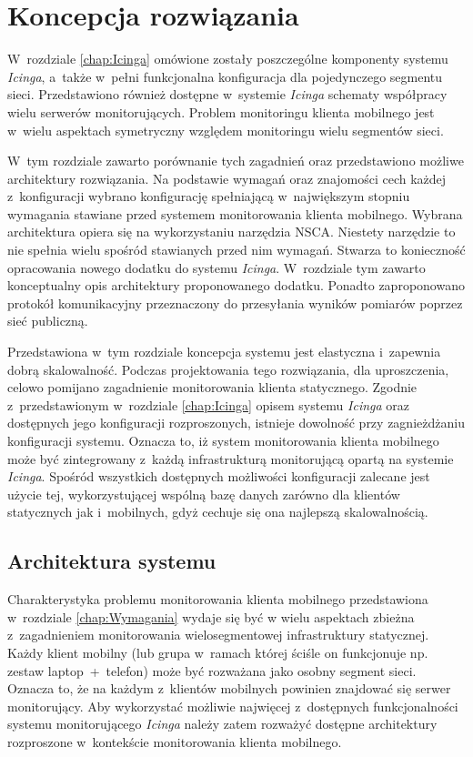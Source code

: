 \chapter{Koncepcja rozwiązania}
\label{chap:ProjektSystemu}

W~rozdziale \ref{chap:Icinga} omówione zostały poszczególne komponenty
systemu {\em Icinga}, a~także w~pełni funkcjonalna konfiguracja dla
pojedynczego segmentu sieci. Przedstawiono również dostępne w~systemie
{\em Icinga} schematy współpracy wielu serwerów monitorujących. Problem
monitoringu klienta mobilnego jest w~wielu aspektach symetryczny
względem monitoringu wielu segmentów sieci.

W~tym rozdziale zawarto porównanie tych zagadnień oraz przedstawiono
możliwe architektury rozwiązania. Na podstawie wymagań oraz znajomości
cech każdej z~konfiguracji wybrano konfigurację spełniającą
w~największym stopniu wymagania stawiane przed systemem monitorowania
klienta mobilnego. Wybrana architektura opiera się na wykorzystaniu
narzędzia NSCA. Niestety narzędzie to nie spełnia wielu spośród
stawianych przed nim wymagań. Stwarza to konieczność opracowania
nowego dodatku do systemu {\em Icinga}. W~rozdziale tym zawarto konceptualny
opis architektury proponowanego dodatku. Ponadto zaproponowano
protokół komunikacyjny przeznaczony do przesyłania wyników pomiarów
poprzez sieć publiczną.

Przedstawiona w~tym rozdziale koncepcja systemu jest elastyczna
i~zapewnia dobrą skalowalność. Podczas projektowania tego rozwiązania,
dla uproszczenia, celowo pomijano zagadnienie monitorowania klienta
statycznego. Zgodnie z~przedstawionym w~rozdziale \ref{chap:Icinga}
opisem systemu {\em Icinga} oraz dostępnych jego konfiguracji rozproszonych,
istnieje dowolność przy zagnieżdżaniu konfiguracji systemu. Oznacza
to, iż system monitorowania klienta mobilnego może być zintegrowany
z~każdą infrastrukturą monitorującą opartą na systemie {\em Icinga}. Spośród
wszystkich dostępnych możliwości konfiguracji zalecane jest użycie
tej, wykorzystującej wspólną bazę danych zarówno dla klientów
statycznych jak i~mobilnych, gdyż cechuje się ona najlepszą
skalowalnością.

\section[Architektura systemu][Architektura systemu]{Architektura
  systemu}

Charakterystyka problemu monitorowania klienta mobilnego przedstawiona
w~rozdziale \ref{chap:Wymagania} wydaje się być w wielu aspektach
zbieżna z~zagadnieniem monitorowania wielosegmentowej infrastruktury
statycznej. Każdy klient mobilny (lub grupa w~ramach której ściśle on
funkcjonuje np. zestaw laptop~+~telefon) może być rozważana jako
osobny segment sieci. Oznacza to, że na każdym z~klientów mobilnych
powinien znajdować się serwer monitorujący. Aby wykorzystać możliwie
najwięcej z~dostępnych funkcjonalności systemu monitorującego {\em Icinga}
należy zatem rozważyć dostępne architektury rozproszone w~kontekście
monitorowania klienta mobilnego.


